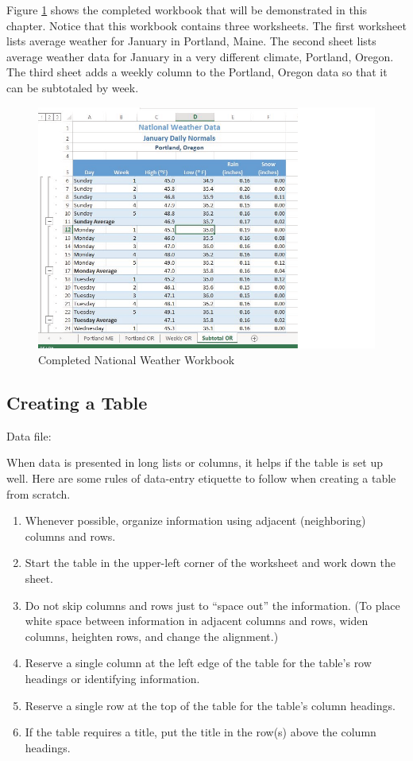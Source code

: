 Figure \ref{05:fig01} shows the completed workbook that will be demonstrated in this chapter. Notice that this workbook contains three worksheets. The first worksheet lists average weather for January in Portland, Maine. The second sheet lists average weather data for January in a very different climate, Portland, Oregon. The third sheet adds a weekly column to the Portland, Oregon data so that it can be subtotaled by week.

\begin{figure}[H]
	\centering
	\includegraphics[width=\maxwidth{.95\linewidth}]{gfx/ch05_fig01}
	\caption{Completed National Weather Workbook}
	\label{05:fig01}
\end{figure}

\subsection{Creating a Table}

Data file: 

When data is presented in long lists or columns, it helps if the table is set up well. Here are some rules of data-entry etiquette to follow when creating a table from scratch.

\begin{enumerate}
	\item Whenever possible, organize information using adjacent (neighboring) columns and rows.
	\item Start the table in the upper-left corner of the worksheet and work down the sheet.
	\item Do not skip columns and rows just to ``space out'' the information. (To place white space between information in adjacent columns and rows, widen columns, heighten rows, and change the alignment.)
	\item Reserve a single column at the left edge of the table for the table's row headings or identifying information.
	\item Reserve a single row at the top of the table for the table's column headings.
	\item If the table requires a title, put the title in the row(s) above the column headings.
\end{enumerate}


